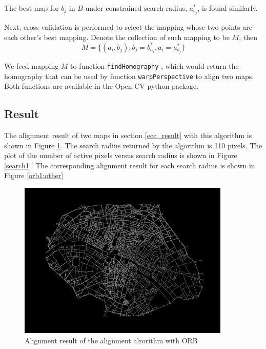 The best map for $b_j$ in $B$ under constrained search radius, $a_{b_j}^*$, is found similarly.

Next, cross-validation is performed to select the mapping whose two points are each other's best mapping. Denote the collection of such mapping to be $M$, then
\begin{equation}
    M = \{(a_i, b_j): b_j = b_{a_i}^*, a_i = a_{b_j}^*\}
\end{equation}

We feed mapping $M$ to function \texttt{findHomography} \cite{mallick_2018_feature}, which would return the homography that can be used by function \texttt{warpPerspective} \cite{mallick_2018_feature} to align two maps. Both functions are available in the Open CV python package.



\subsection{Result}

The alignment result of two maps in section \ref{ecc_result} with this algorithm is shown in Figure \ref{orb1}. The search radius returned by the algorithm is 110 pixels. The plot of the number of active pixels versus search radius is shown in Figure \ref{search1}. The corresponding alignment result for each search radius is shown in Figure \ref{orb1:other}

\begin{figure}[h!]
\centering
\includegraphics[width=0.9\textwidth]{Images/Map1/map_1_allignment_radius_110.png}
\caption{Alignment result of the alignment alrorithm with ORB}
\label{orb1}
\end{figure}

